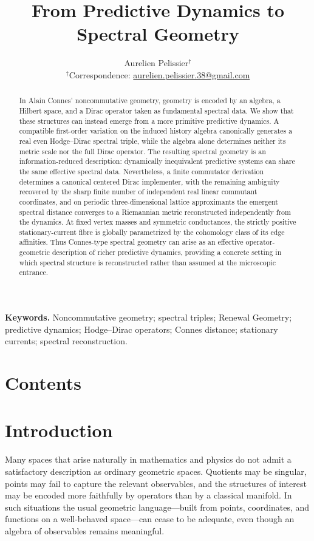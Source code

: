 \documentclass[11pt]{article}
\title{\textbf{From Predictive Dynamics to Spectral Geometry}}
\author{%
  Aurelien Pelissier$^{\dagger}$\\
  {\small $^{\dagger}$Correspondence: \href{mailto:aurelien.pelissier.38@gmail.com}{aurelien.pelissier.38@gmail.com}}%
  \vspace{-0.5cm}
}
\date{}
\makeatletter
\newcommand{\maintableofcontents}{\section*{Contents}\@starttoc{maintoc}}
\theoremstyle{definition}
\theoremstyle{remark}
\theoremstyle{definition}
\theoremstyle{remark}
\makeatother
\begin{document}
\maketitle

\begin{abstract}
In Alain Connes' noncommutative geometry, geometry is encoded by an algebra, a Hilbert space, and a Dirac operator taken as fundamental spectral data. We show that these structures can instead emerge from a more primitive predictive dynamics. A compatible first-order variation on the induced history algebra canonically generates a real even Hodge--Dirac spectral triple, while the algebra alone determines neither its metric scale nor the full Dirac operator.
%
The resulting spectral geometry is an information-reduced description: dynamically inequivalent predictive systems can share the same effective spectral data. Nevertheless, a finite commutator derivation determines a canonical centered Dirac implementer, with the remaining ambiguity recovered by the sharp finite number of independent real linear commutant coordinates, and on periodic three-dimensional lattice approximants the emergent spectral distance converges to a Riemannian metric reconstructed independently from the dynamics. At fixed vertex masses and symmetric conductances, the strictly positive stationary-current fibre is globally parametrized by the cohomology class of its edge affinities.
%
Thus Connes-type spectral geometry can arise as an effective operator-geometric description of richer predictive dynamics, providing a concrete setting in which spectral structure is reconstructed rather than assumed at the microscopic entrance.
\end{abstract}

\medskip
\noindent\textbf{Keywords.}
Noncommutative geometry; spectral triples; Renewal Geometry; predictive dynamics;
Hodge--Dirac operators; Connes distance; stationary currents; spectral reconstruction.

\setcounter{tocdepth}{2}
\clearpage
\maintableofcontents
\clearpage

\section{Introduction}
\label{sec:introduction}

Many spaces that arise naturally in mathematics and physics do not admit a
satisfactory description as ordinary geometric spaces. Quotients may be singular,
points may fail to capture the relevant observables, and the structures of interest
may be encoded more faithfully by operators than by a classical manifold. In such
situations the usual geometric language---built from points, coordinates, and
functions on a well-behaved space---can cease to be adequate, even though an
algebra of observables remains meaningful.
\end{document}
